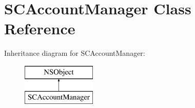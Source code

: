 \hypertarget{interface_s_c_account_manager}{}\section{S\+C\+Account\+Manager Class Reference}
\label{interface_s_c_account_manager}
Inheritance diagram for S\+C\+Account\+Manager\+:\begin{figure}[H]
\begin{center}
\leavevmode
\includegraphics[height=2.000000cm]{interface_s_c_account_manager}
\end{center}
\end{figure}
